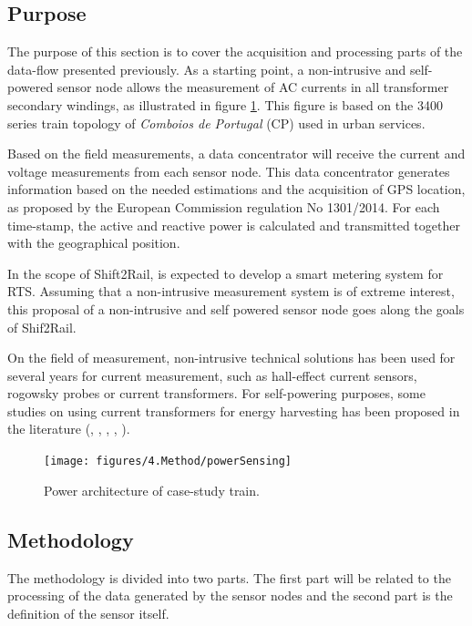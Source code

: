 \subsection{Purpose}

The purpose of this section is to cover the acquisition and processing parts of the data-flow presented previously. As a starting point, a non-intrusive and self-powered sensor node allows the measurement of AC currents in all transformer secondary windings, as illustrated in figure \ref{fig:4.powerSensing}. This figure is based on the 3400 series train topology of \textit{Comboios de Portugal} (CP) used in urban services.

Based on the field measurements, a data concentrator will receive the current and voltage measurements from each sensor node. This data concentrator generates information based on the needed estimations and the acquisition of GPS location, as proposed by the European Commission regulation No 1301/2014. For each time-stamp, the active and reactive power is calculated and transmitted together with the geographical position.

In the scope of Shift2Rail, is expected to develop a smart metering system for RTS. Assuming that a non-intrusive measurement system is of extreme interest, this proposal of a non-intrusive and self powered sensor node goes along the goals of Shif2Rail.

On the field of measurement, non-intrusive technical solutions has been used for several years for current measurement, such as hall-effect current sensors, rogowsky probes or current transformers.
For self-powering purposes, some studies on using current transformers for energy harvesting has been proposed in the literature (\cite{ahola2008}, \cite{wu2013}, \cite{moon2015}, \cite{amaro2015}, \cite{brunelli2016}).


\begin{figure}[h!]
	\centering
	\vspace{-1em}
	\texttt{[image: figures/4.Method/powerSensing]}
	\caption{Power architecture of case-study train.}
	\label{fig:4.powerSensing}
\end{figure}






\subsection{Methodology}

The methodology is divided into two parts. The first part will be related to the processing of the data generated by the sensor nodes and the second part is the definition of the sensor itself.

